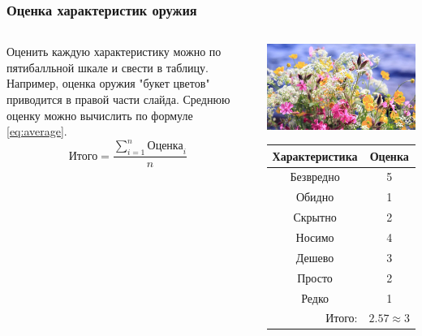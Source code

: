 \begin{frame}
    \frametitle{Оценка характеристик оружия}

    \begin{columns}
            Оценить каждую характеристику можно по пятибалльной шкале и свести в таблицу. Например, оценка оружия \alert{"букет цветов"} приводится в правой части слайда. Среднюю оценку можно вычислить по формуле \eqref{eq:average}. 
            \begin{equation}
                \label{eq:average}
                \text{Итого}=\frac{\displaystyle\sum_{i=1}^{n}\text{Оценка}_i}{n}
            \end{equation}
            
            
            \begin{center}
                \includegraphics[width=.4\textheight]{fig/flowers}
                
                \begin{tabular}{c|c}
                    \hline\hline
                    Характеристика              & Оценка\\ \hline\hline
                    Безвредно                   & 5 \\
                    Обидно                      & 1 \\
                    Скрытно                     & 2 \\
                    Носимо                      & 4 \\
                    Дешево                      & 3 \\
                    Просто                      & 2 \\ 
                    Редко                       & 1 \\ \hline
                    \multicolumn{1}{r|}{Итого:} & $2.57\approx 3$ \\
                \end{tabular}
            \end{center}
    \end{columns}    
\end{frame}

